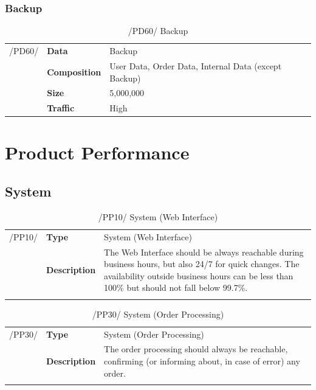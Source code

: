 \documentclass[11pt,a4paper,oneside,svgnames]{report}
\begin{document}
\subsection{Backup}
\begin{table}[H]
\centering
\begin{tabular}{llp{8.75cm}}
\cellcolor{white}/PD60/	& \textbf{Data}			& Backup\\
\cellcolor{white}		& \textbf{Composition}	& User Data, Order Data, Internal Data (except Backup)\\
\cellcolor{white}		& \textbf{Size}		& 5,000,000\\
\cellcolor{white}		& \textbf{Traffic}		& High\\
\end{tabular}
\caption{/PD60/ Backup}
\label{tab:pd60}
\end{table}

\chapter{Product Performance}
\section{System}
\begin{table}[H]
\centering
\begin{tabular}{llp{8.75cm}}
\cellcolor{white}/PP10/	& \textbf{Type}			& System (Web Interface)\\
\cellcolor{white}		& \textbf{Description}	& The Web Interface should be always reachable during business hours, but also 24/7 for quick changes. The availability outside business hours can be less than 100\% but should not fall below 99.7\%.\\
\cellcolor{white}		\hfill \\
\end{tabular}
\caption{/PP10/ System (Web Interface)}
\label{tab:pp10}
\end{table}

\begin{table}[H]
\centering
\begin{tabular}{llp{8.75cm}}
\cellcolor{white}/PP30/	& \textbf{Type}			& System (Order Processing)\\
\cellcolor{white}		& \textbf{Description}	& The order processing should always be reachable, confirming (or informing about, in case of error) any order.\\
\cellcolor{white}		\hfill \\
\end{tabular}
\caption{/PP30/ System (Order Processing)}
\label{tab:pp30}
\end{table}
\end{document}
